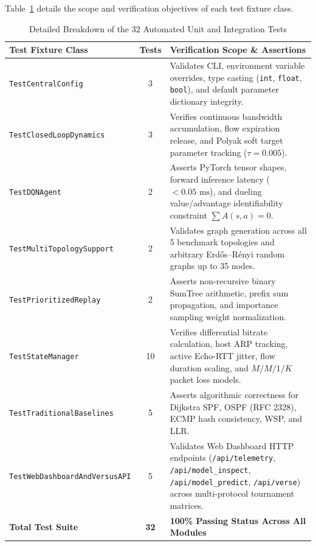 Table~\ref{tab:test_cases_breakdown} details the scope and verification objectives of each test fixture class.

\begin{table}[htbp]
\centering
\caption{Detailed Breakdown of the 32 Automated Unit and Integration Tests}
\label{tab:test_cases_breakdown}
\small
\begin{tabularx}{\textwidth}{l c X}
\toprule
\textbf{Test Fixture Class} & \textbf{Tests} & \textbf{Verification Scope \& Assertions} \\
\midrule
\texttt{TestCentralConfig} & 3 & Validates CLI, environment variable overrides, type casting (\texttt{int}, \texttt{float}, \texttt{bool}), and default parameter dictionary integrity. \\
\addlinespace
\texttt{TestClosedLoopDynamics} & 3 & Verifies continuous bandwidth accumulation, flow expiration release, and Polyak soft target parameter tracking ($\tau = 0.005$). \\
\addlinespace
\texttt{TestDQNAgent} & 2 & Asserts PyTorch tensor shapes, forward inference latency ($<0.05\text{ ms}$), and dueling value/advantage identifiability constraint $\sum A(s, a) = 0$. \\
\addlinespace
\texttt{TestMultiTopologySupport} & 2 & Validates graph generation across all 5 benchmark topologies and arbitrary Erd\H{o}s--R\'enyi random graphs up to 35 nodes. \\
\addlinespace
\texttt{TestPrioritizedReplay} & 2 & Asserts non-recursive binary SumTree arithmetic, prefix sum propagation, and importance sampling weight normalization. \\
\addlinespace
\texttt{TestStateManager} & 10 & Verifies differential bitrate calculation, host ARP tracking, active Echo-RTT jitter, flow duration scaling, and $M/M/1/K$ packet loss models. \\
\addlinespace
\texttt{TestTraditionalBaselines} & 5 & Asserts algorithmic correctness for Dijkstra SPF, OSPF (RFC 2328), ECMP hash consistency, WSP, and LLR. \\
\addlinespace
\texttt{TestWebDashboardAndVersusAPI} & 5 & Validates Web Dashboard HTTP endpoints (\texttt{/api/telemetry}, \texttt{/api/model\_inspect}, \texttt{/api/model\_predict}, \texttt{/api/verse}) across multi-protocol tournament matrices. \\
\midrule
\textbf{Total Test Suite} & \textbf{32} & \textbf{100\% Passing Status Across All Modules} \\
\bottomrule
\end{tabularx}
\end{table}

